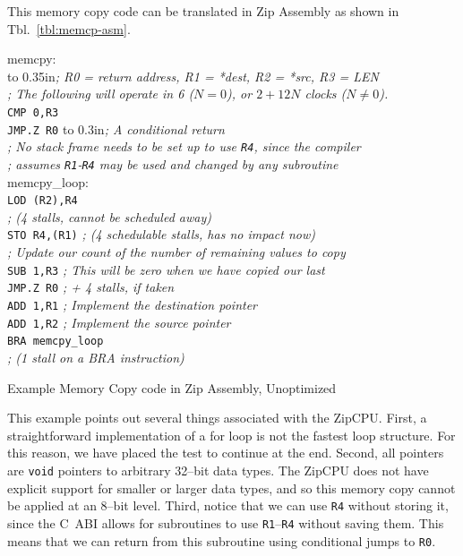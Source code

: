 \documentclass{gqtekspec}
\begin{document}
This memory copy code can be translated in Zip Assembly as shown in
Tbl.~\ref{tbl:memcp-asm}.
\begin{table}\begin{center}
\begin{tabbing}
memcpy: \\
\hbox to 0.35in{}\={\em ; R0 = return address, R1 = *dest, R2 = *src, R3 = LEN} \\
\>	{\em ; The following will operate in 6 ($N=0$), or $2+12N$ clocks ($N\neq 0$).} \\
\>	{\tt CMP 0,R3} \\ %
\>	{\tt JMP.Z R0} \hbox to 0.3in{}\= {\em ; A conditional return }\\
\>	{\em ; No stack frame needs to be set up to use {\tt R4}, since the compiler}\\
\>	{\em  ; assumes {\tt R1}-{\tt R4} may be used and changed by any subroutine} \\
memcpy\_loop: \\ %
\>	{\tt LOD (R2),R4} \\
\>	{\em ; (4 stalls, cannot be scheduled away)} \\
\>	{\tt STO R4,(R1)} \> {\em ; (4 schedulable stalls, has no impact now)} \\
\>	{\em ; Update our count of the number of remaining values to copy}\\
\>	{\tt SUB 1,R3}	\> {\em ; This will be zero when we have copied our last}\\
\>	{\tt JMP.Z R0}	\> {\em ; + 4 stalls, if taken}\\
\>	{\tt ADD 1,R1}	\> {\em ; Implement the destination pointer }\\
\>	{\tt ADD 1,R2}	\> {\em ; Implement the source pointer }\\
\>	{\tt BRA memcpy\_loop} \\
\>	{\em ; (1 stall on a BRA instruction)} \\
\end{tabbing}
\caption{Example Memory Copy code in Zip Assembly, Unoptimized}\label{tbl:memcp-asm}
\end{center}\end{table}
This example points out several things associated with the ZipCPU.  First,
a straightforward implementation of a for loop is not the fastest loop
structure.  For this reason, we have placed the test to continue at the
end.  Second, all pointers are {\tt void} pointers to arbitrary 32--bit
data types.  The ZipCPU does not have explicit support for smaller or larger
data types, and so this memory copy cannot be applied at an 8--bit level.
Third, notice that we can use {\tt R4} without storing it, since the C~ABI
allows for subroutines to use {\tt R1}--{\tt R4} without saving them.  This
means that we can return from this subroutine using conditional jumps to
{\tt R0}.
\end{document}
